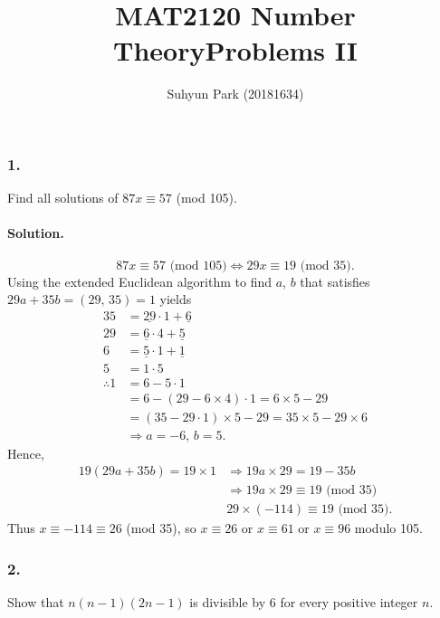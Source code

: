 



\title{MAT2120 Number Theory\newline\space Problems II}
\author{Suhyun Park (20181634)}

\maketitle

\subsubsection{1.} Find all solutions of $87x \equiv 57$ (mod 105). 

\paragraph{Solution.}
\[
    87x \equiv 57 \mbox{ (mod 105)} \Leftrightarrow 29x \equiv 19 \mbox{ (mod 35)}.
\]
Using the extended Euclidean algorithm to find $a$, $b$ that satisfies
$29a + 35b = \left(29,\,35\right)= 1$ yields
\begin{align*}
    35 &= \underline{29} \cdot 1 + \underline{6} \\
    29 &= \underline{6} \cdot 4 + \underline{5} \\
    6 &= \underline{5} \cdot 1 + \underline{1} \\
    5 &= 1 \cdot 5 \\
    \therefore 1 &= 6 - 5 \cdot 1 \\
     &= 6 - \left(29 - 6 \times 4\right) \cdot 1 = 6 \times 5 - 29 \\
     &= \left(35 - 29 \cdot 1\right) \times 5 - 29 = 35 \times 5 - 29 \times 6 \\
     & \Rightarrow a = -6,\,b = 5.
\end{align*}
Hence,
\begin{align*}
    19\left(29a+35b\right)=19\times 1 &\Rightarrow 19a \times 29 = 19 - 35b \\
    &\Rightarrow 19a \times 29 \equiv 19 \mbox{ (mod 35)} \\
    & 29 \times \left(-114\right) \equiv 19 \mbox{ (mod 35)}.
\end{align*}
Thus $x \equiv -114 \equiv 26$ (mod 35),
so $x \equiv 26$ or $x \equiv 61$ or $x \equiv 96$ modulo 105.

\subsubsection{2.} Show that $n\left(n-1\right)\left(2n-1\right)$ is
divisible by 6 for every positive integer $n$.

